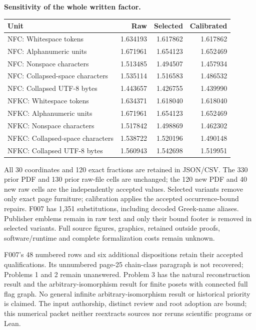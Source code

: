 \documentclass[11pt,a4paper]{article}
\begin{document}
\textbf{Sensitivity of the whole written factor.}
\begin{center}\small\begin{tabular}{lrrr}\toprule
Unit & Raw & Selected & Calibrated\\\midrule
NFC: Whitespace tokens & 1.634193 & 1.617862 & 1.617862\\
NFC: Alphanumeric units & 1.671961 & 1.654123 & 1.652469\\
NFC: Nonspace characters & 1.513485 & 1.494507 & 1.457934\\
NFC: Collapsed-space characters & 1.535114 & 1.516583 & 1.486532\\
NFC: Collapsed UTF-8 bytes & 1.443657 & 1.426755 & 1.439990\\
NFKC: Whitespace tokens & 1.634371 & 1.618040 & 1.618040\\
NFKC: Alphanumeric units & 1.671961 & 1.654123 & 1.652469\\
NFKC: Nonspace characters & 1.517842 & 1.498869 & 1.462302\\
NFKC: Collapsed-space characters & 1.538722 & 1.520196 & 1.490148\\
NFKC: Collapsed UTF-8 bytes & 1.560943 & 1.542698 & 1.519951\\
\bottomrule\end{tabular}\end{center}
All 30 coordinates and 120 exact fractions are retained in JSON/CSV. The 330 prior PDF and 130 prior raw-file cells are unchanged; the 120 new PDF and 40 new raw cells are the independently accepted values. Selected variants remove only exact page furniture; calibration applies the accepted occurrence-bound repairs. F007 has 1,351 substitutions, including decoded Greek-name aliases. Publisher emblems remain in raw text and only their bound footer is removed in selected variants. Full source figures, graphics, retained outside proofs, software/runtime and complete formalization costs remain unknown.

F007's 48 numbered rows and six additional dispositions retain their accepted qualifications. Its unnumbered page-25 chain-class paragraph is not recovered; Problems 1 and 2 remain unanswered. Problem 3 has the natural reconstruction result and the arbitrary-isomorphism result for finite posets with connected full flag graph. No general infinite arbitrary-isomorphism result or historical priority is claimed. The input authorship, distinct review and root adoption are bound; this numerical packet neither reextracts sources nor reruns scientific programs or Lean.
\end{document}
